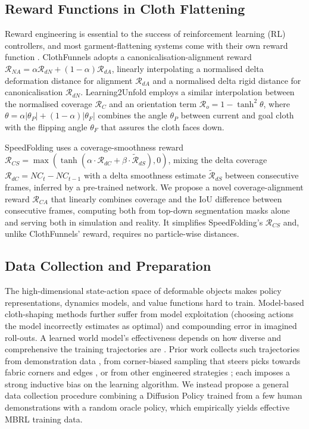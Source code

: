 \documentclass[journal]{IEEEtran}
\newif\ifshowrev\showrevtrue
\newcommand{\rev}[1]{\ifshowrev\textcolor{revblue}{#1}\else#1\fi}
\newif\ifshowrrev\showrrevtrue
\newcommand{\rrev}[1]{\ifshowrrev\textcolor{rrevred}{#1}\else#1\fi}
\begin{document}
\subsection{Reward Functions in Cloth Flattening} \label{sec:reward-literature}
\rev{Reward engineering is essential to the success of reinforcement learning (RL) controllers, and most garment-flattening systems come with their own reward function \cite{canberk2023cloth, gu2023learning, avigal2022speedfolding}. ClothFunnels \cite{canberk2023cloth} adopts a canonicalisation-alignment reward $\mathcal{R}_{NA} = \alpha\mathcal{R}_{dN} + (1-\alpha)\mathcal{R}_{dA}$, linearly interpolating a normalised delta deformation distance for alignment $\mathcal{R}_{dA}$ and a normalised delta rigid distance for canonicalisation $\mathcal{R}_{dN}$. Learning2Unfold \cite{gu2023learning} employs a similar interpolation between the normalised coverage $\mathcal{R}_C$ and an orientation term $\mathcal{R}_o = 1 - \tanh^2\theta$, where $\theta = \alpha|\theta_P| + (1-\alpha)|\theta_F|$ combines the angle $\theta_P$ between current and goal cloth with the flipping angle $\theta_F$ that assures the cloth faces down.}

\rev{SpeedFolding \cite{avigal2022speedfolding} uses a coverage-smoothness reward $\mathcal{R}_{CS} = \max(\tanh(\alpha \cdot \mathcal{R}_{dC} + \beta \cdot \tilde{\mathcal{R}}_{dS}), 0)$, mixing the delta coverage $\mathcal{R}_{dC} = NC_t - NC_{t-1}$ with a delta smoothness estimate $\tilde{\mathcal{R}}_{dS}$ between consecutive frames, inferred by a pre-trained network. We propose a novel coverage-alignment reward $\mathcal{R}_{CA}$ that linearly combines coverage and the IoU difference between consecutive frames, computing both from top-down segmentation masks alone and serving both in simulation and reality. It simplifies SpeedFolding's $\mathcal{R}_{CS}$ and, unlike ClothFunnels' reward, requires no particle-wise distances.}

\subsection{Data Collection and Preparation}

\rev{The high-dimensional state-action space of deformable objects makes policy representations, dynamics models, and value functions hard to train\rrev{. Model-based cloth-shaping methods further suffer from model exploitation} (choosing actions the model incorrectly estimates as optimal) and compounding error in imagined roll-outs. A learned world model's effectiveness depends on how diverse and comprehensive the training trajectories are \cite{duan2024learning}. \rrev{Prior work collects such trajectories from demonstration data \cite{matas2018sim}, from corner-biased sampling that steers picks towards fabric corners and edges \cite{hoque2022visuospatial, weng2022fabricflownet}, or from other engineered strategies \cite{arnold2023cloth, lin2022learning}; each imposes a strong inductive bias on the learning algorithm.} We instead propose a general data collection procedure combining a Diffusion Policy \cite{chi2023diffusionpolicy} trained from a few human demonstrations with a random oracle policy, which empirically yields effective MBRL training data.}
\end{document}

